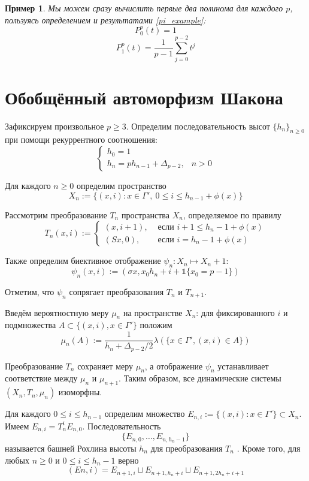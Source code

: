 \documentclass[14pt, a4paper, russian]{report}
\newtheorem{example}{\indent Пример}
\begin{document}
\begin{example}\label{poly_example}
Мы можем сразу вычислить первые два полинома для каждого $p$, пользуясь определением и результатами \cref{pi_example}:
\begin{equation}\label{eq:p_0}
P_0^p(t) = 1
\end{equation}
\begin{equation}\label{eq:p_1}
P_1^p(t) = \frac{1}{p-1} \sum\limits_{j=0}^{p-2} t^j
\end{equation}
\end{example}

\section{Обобщённый автоморфизм Шакона}

Зафиксируем произвольное $p \ge 3$. Определим последовательность высот $\{h_n\}_{n \ge 0}$ при помощи рекуррентного соотношения:
$$\begin{cases}
h_0 = 1 \\
h_n = p h_{n-1}+\Delta_{p-2},& n > 0 
\end{cases}$$

Для каждого $n \ge 0$ определим пространство
$$X_n:=\{(x,i): x \in \Gamma',\ 0 \le i \le h_{n-1} + \phi(x)\}$$

Рассмотрим преобразование $T_n$ пространства $X_n$, определяемое по правилу
$$T_n(x, i) := \begin{cases}
(x,i+1), & \text{ если } i+1 \le h_n - 1 + \phi(x) \\
(Sx,0), & \text{ если } i=h_n-1+\phi(x) \end{cases}$$

Также определим биективное отображение $\psi_n : X_n \mapsto X_n+1$:
$$\psi_n(x,i):=(\sigma x, x_0 h_n + i + \mathbb{1}\{x_0=p-1\})$$

Отметим, что $\psi_n$ сопрягает преобразования $T_n$ и
$T_{n+1}$.

Введём вероятностную меру $\mu_n$ на пространстве $X_n$: для фиксированного $i$ и подмножества
$A \subset \{(x, i), x\in\Gamma' \}$ положим
$$\mu_n(A):=\frac{1}{h_n + \Delta_{p-2}/2} \lambda (\{x \in \Gamma', (x, i) \in A\})$$

Преобразование $T_n$ сохраняет меру $\mu_n$, а отображение $\psi_n$ устанавливает соответствие между $\mu_n$ и $\mu_{n+1}$. Таким образом, все динамические системы $(X_n, T_n, \mu_n)$ изоморфны.

Для каждого $ 0 \le i \le h_{n-1}$ определим множество
$E_{n,i} := \{(x, i) : x \in \Gamma'\} \subset X_n$. Имеем $E_{n,i} = T^i_n E_{n,0}$. Последовательность
 $$\{E_{n,0},\ldots,E_{n,h_n-1}\}$$
называется башней Рохлина высоты $h_n$ для преобразования $T_n$ \cite{rokhlin_towers}. Кроме того, для любых $n \ge 0$ и $0 \le i \le h_n-1$ верно 
\begin{equation}\label{eq:embedding}
(En,i) = E_{n+1,i} \sqcup E_{n+1,h_n+i} \sqcup E_{n+1,2h_n+i+1}
\end{equation}
\end{document}
